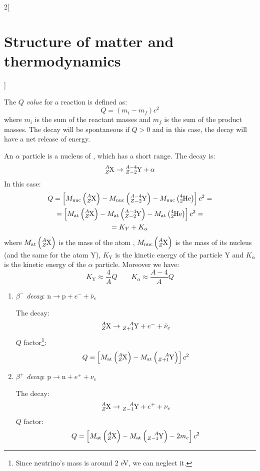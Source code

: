 \documentclass[../../../main.tex]{subfiles}
\begin{document}
\begin{multicols}{2}[\section{Structure of matter and thermodynamics}]
    \begin{definition}[Q value]
        The \textit{$Q$ value} for a reaction is defined as: $$Q=(m_i-m_f)c^2$$ where $m_i$ is the sum of the reactant masses and $m_f$ is the sum of the product masses. The decay will be spontaneous if $Q>0$ and in this case, the decay will have a net release of energy.
    \end{definition}
    \begin{definition}
        An $\alpha$ particle is a nucleus of , which has a short range.
        The decay is: $$\ce{^$A$_$Z$X}\rightarrow\ce{^$A-4$_$Z-2$Y}+\alpha$$
        In this case:
        \begin{multline*}
            Q=\left[M_\text{nuc}\left(\ce{^$A$_$Z$X}\right)-M_\text{nuc}\left(\ce{^$A-4$_$Z-2$Y}\right)-M_\text{nuc}\left(\ce{^4_2He}\right)\right]c^2=\\=\left[M_\text{at}\left(\ce{^$A$_$Z$X}\right)-M_\text{at}\left(\ce{^$A-4$_$Z-2$Y}\right)-M_\text{at}\left(\ce{^4_2He}\right)\right]c^2=\\=K_Y+K_\alpha
        \end{multline*}
        where $M_\text{at}\left(\ce{^$A$_$Z$X}\right)$ is the mass of the atom , $M_\text{nuc}\left(\ce{^$A$_$Z$X}\right)$ is the mass of its nucleus (and the same for the atom Y), $K_\text{Y}$ is the kinetic energy of the particle Y and $K_\alpha$ is the kinetic energy of the $\alpha$ particle. Moreover we have: $$K_\text{Y}\approx \frac{4}{A}Q\qquad K_\alpha\approx \frac{A-4}{A}Q$$
    \end{definition}
    \begin{definition}
        \hfill
        \begin{enumerate}
            \item \textit{$\beta^-$ decay}: $\text{n}\rightarrow\text{p}+e^-+\bar{\nu}_e$\par
                  The decay: $$\ce{^$A$_$Z$X}\rightarrow\ce{^$A$_$Z+1$Y}+e^-+\bar{\nu}_e$$
                  $Q$ factor\footnote{Since neutrino's mass is around 2 eV, we can neglect it.}: $$Q=\left[M_\text{at}\left(\ce{^$A$_$Z$X}\right)-M_\text{at}\left(\ce{^$A$_$Z+1$Y}\right)\right]c^2$$
            \item \textit{$\beta^+$ decay}: $\text{p}\rightarrow\text{n}+e^++\nu_e$\par
                  The decay: $$\ce{^$A$_$Z$X}\rightarrow\ce{^$A$_$Z-1$Y}+e^++\nu_e$$
                  $Q$ factor: $$Q=\left[M_\text{at}\left(\ce{^$A$_$Z$X}\right)-M_\text{at}\left(\ce{^$A$_$Z-1$Y}\right)-2m_e\right]c^2$$

\end{enumerate}
\end{definition}
\end{multicols}
\end{document}

